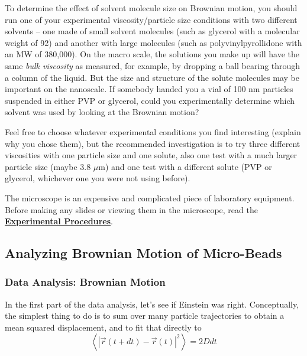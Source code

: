 \documentclass{../lab}
\begin{document}
To determine the effect of solvent molecule size on Brownian motion, you should run one of your experimental viscosity/particle size conditions with two different solvents -- one made of small solvent molecules (such as glycerol with a molecular weight of 92) and another with large molecules (such as polyvinylpyrollidone with an MW of 380,000). On the macro scale, the solutions you make up will have the same \emph{bulk viscosity} as measured, for example, by dropping a ball bearing through a column of the liquid. But the size and structure of the solute molecules may be important on the nanoscale. If somebody handed you a vial of 100 nm particles suspended in either PVP or glycerol, could you experimentally determine which solvent was used by looking at the Brownian motion?

Feel free to choose whatever experimental conditions you find interesting (explain why you chose them), but the recommended investigation is to try three different viscosities with one particle size and one solute, also one test with a much larger particle size (maybe 3.8 $\mu$m) and one test with a different solute (PVP or glycerol, whichever one you were not using before).

The microscope is an expensive and complicated piece of laboratory equipment. Before making any slides or viewing them in the microscope, read the \href{http://experimentationlab.berkeley.edu/node/84}{\textbf{Experimental Procedures}}.



\subsection{Analyzing Brownian Motion of Micro-Beads}

\subsubsection{Data Analysis: Brownian Motion}

In the first part of the data analysis, let's see if Einstein was right. Conceptually, the simplest thing to do is to sum over many particle trajectories to obtain a mean squared displacement, and to fit that directly to
\[
\left\langle {\left| \vec r(t+dt)-\vec r(t) \right|}^2 \right\rangle = 2 D dt
\]
\end{document}
